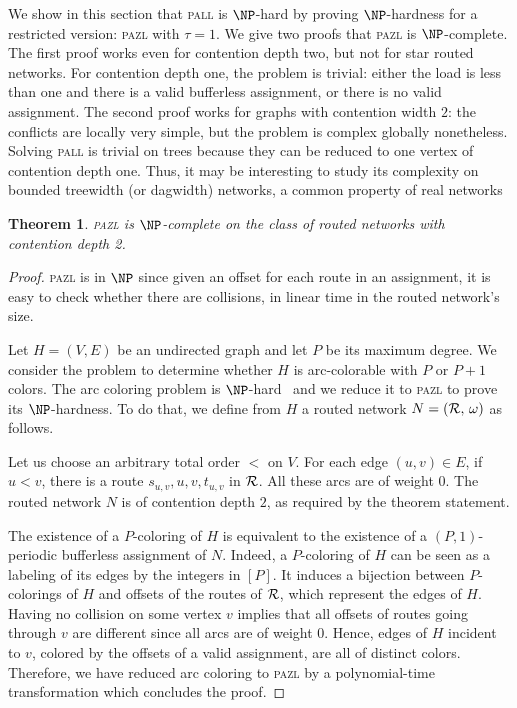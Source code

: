 \documentclass[a4paper,10pt]{journal}
\newtheorem{theorem}{Theorem}
\newcommand\pazl{\textsc{pazl}\xspace}
\newcommand\pall{\textsc{pall}\xspace}
\begin{document}
	We show in this section that \pall is $\NP$-hard by proving $\NP$-hardness for a restricted version: \pazl with $\tau = 1$. We give two proofs that \pazl is $\NP$-complete.
	The first proof works even for contention depth two, but not for star routed networks.
	 For contention depth one, the problem is trivial: either the load is less than one and there is a valid bufferless assignment, or there is no valid assignment. 
	 The second proof works for graphs with contention width $2$: the conflicts are locally very simple, but the problem is complex globally nonetheless. Solving \pall is trivial on trees because they can be reduced to one vertex of contention depth one. Thus, it may be interesting to study its complexity on bounded treewidth (or dagwidth) networks, a common property of real networks~\cite{de2011treewidth}
 

 \begin{theorem}
\pazl is $\NP$-complete on the class of routed networks with contention depth 2.
\end{theorem}
 \begin{proof}
 \pazl is in $\NP$ since given an offset for each route in an assignment, it is easy to check whether there are collisions, in linear time in the routed network's size.
 
  Let $H=(V,E)$ be an undirected graph and let $P$ be its maximum degree. We consider the problem to determine whether $H$ is arc-colorable with $P$ or $P+1$ colors. The arc coloring problem is $\NP$-hard~\cite{holyer1981np} and we reduce it to \pazl to prove its $\NP$-hardness. To do that, we define from $H$ a routed network $N = ({\cal R},\, \omega)$ as follows. 

  Let us choose an arbitrary total order $<$ on $V$.
  For each edge $(u,v) \in E$, if $u<v$, there is a route $s_{u,v},u,v,t_{u,v}$ in ${\cal R}$. 
  All these arcs are of weight $0$. The routed network $N$ is of contention depth $2$, as required by the theorem statement. 

  The existence of a $P$-coloring of $H$ is equivalent to the existence of a $(P,1)$-periodic bufferless assignment of $N$. Indeed, a $P$-coloring of $H$ can be seen as a labeling of its edges by the integers in $[P]$. It induces a bijection between $P$-colorings of $H$ and offsets of the routes of ${\cal R}$, which represent the edges of $H$. Having no collision on some vertex $v$ implies that all offsets of routes going through $v$ are different since all arcs are of weight $0$. Hence, edges of $H$ incident to $v$, colored by the offsets of a valid assignment, are all of distinct colors. Therefore, we have reduced arc coloring to \pazl by a polynomial-time transformation which concludes the proof. 
 \end{proof}
 
\end{document}
